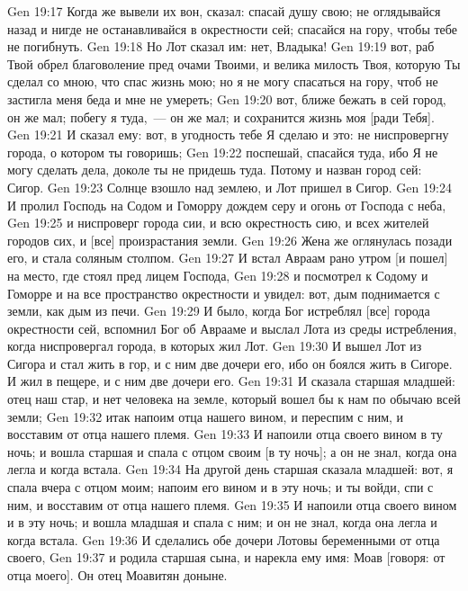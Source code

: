 \vs Gen 19:17 Когда же вывели их вон,  сказал: спасай душу свою; не оглядывайся назад и нигде не останавливайся в окрестности сей; спасайся на гору, чтобы тебе не погибнуть.
\vs Gen 19:18 Но Лот сказал им: нет, Владыка!
\vs Gen 19:19 вот, раб Твой обрел благоволение пред очами Твоими, и велика милость Твоя, которую Ты сделал со мною, что спас жизнь мою; но я не могу спасаться на гору, чтоб не застигла меня беда и мне не умереть;
\vs Gen 19:20 вот, ближе бежать в сей город, он же мал; побегу я туда,~--- он же мал; и сохранится жизнь моя [ради Тебя].
\vs Gen 19:21 И сказал ему: вот, в угодность тебе Я сделаю и это: не ниспровергну города, о котором ты говоришь;
\vs Gen 19:22 поспешай, спасайся туда, ибо Я не могу сделать дела, доколе ты не придешь туда. Потому и назван город сей: Сигор.
\vs Gen 19:23 Солнце взошло над землею, и Лот пришел в Сигор.
\rsbpar\vs Gen 19:24 И пролил Господь на Содом и Гоморру дождем серу и огонь от Господа с неба,
\vs Gen 19:25 и ниспроверг города сии, и всю окрестность сию, и всех жителей городов сих, и [все] произрастания земли.
\vs Gen 19:26 Жена же  оглянулась позади его, и стала соляным столпом.
\rsbpar\vs Gen 19:27 И встал Авраам рано утром [и пошел] на место, где стоял пред лицем Господа,
\vs Gen 19:28 и посмотрел к Содому и Гоморре и на все пространство окрестности и увидел: вот, дым поднимается с земли, как дым из печи.
\vs Gen 19:29 И было, когда Бог истреблял [все] города окрестности сей, вспомнил Бог об Аврааме и выслал Лота из среды истребления, когда ниспровергал города, в которых жил Лот.
\rsbpar\vs Gen 19:30 И вышел Лот из Сигора и стал жить в гор, и с ним две дочери его, ибо он боялся жить в Сигоре. И жил в пещере, и с ним две дочери его.
\vs Gen 19:31 И сказала старшая младшей: отец наш стар, и нет человека на земле, который вошел бы к нам по обычаю всей земли;
\vs Gen 19:32 итак напоим отца нашего вином, и переспим с ним, и восставим от отца нашего племя.
\vs Gen 19:33 И напоили отца своего вином в ту ночь; и вошла старшая и спала с отцом своим [в ту ночь]; а он не знал, когда она легла и когда встала.
\vs Gen 19:34 На другой день старшая сказала младшей: вот, я спала вчера с отцом моим; напоим его вином и в эту ночь; и ты войди, спи с ним, и восставим от отца нашего племя.
\vs Gen 19:35 И напоили отца своего вином и в эту ночь; и вошла младшая и спала с ним; и он не знал, когда она легла и когда встала.
\vs Gen 19:36 И сделались обе дочери Лотовы беременными от отца своего,
\vs Gen 19:37 и родила старшая сына, и нарекла ему имя: Моав [говоря:  от отца моего]. Он отец Моавитян доныне.
